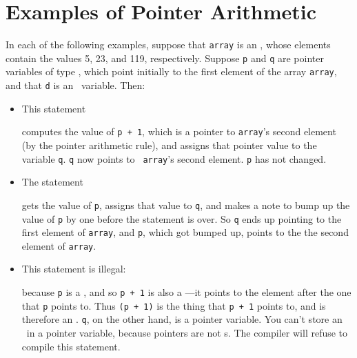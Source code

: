 %
%
%

\section{Examples of Pointer Arithmetic}

In each of the following examples, suppose that {\tt array} is an \Int, whose elements contain the values 5, 23, and 119, respectively.
Suppose {\tt p} and {\tt q} are pointer variables of type \Int, which
point initially to the first element of the array {\tt array}, and that
{\tt d} is an \int\ variable.  Then:

\begin{itemize}
\item This statement
\begin{flushleft}
\verb% q = p + 1; % 
\end{flushleft}

computes the value of {\tt p + 1}, which is a pointer to {\tt array}'s
second element (by the pointer arithmetic rule), and assigns that
pointer value to the variable {\tt q}.  {\tt q} now points to {\tt
array}'s second element.  {\tt p} has not changed.

\item The statement
\begin{flushleft}
\verb% q = p++; % 
\end{flushleft}

gets the value of {\tt p}, assigns that value to {\tt q}, and makes a
note to bump up the value of {\tt p} by one before the statement is
over.  So {\tt q} ends up pointing to the first element of {\tt array},
and {\tt p}, which got bumped up, points to the the second element of
{\tt array}.

\item This statement is illegal:

\begin{flushleft}
\verb% q = *(p + 1);%
\end{flushleft}

\noindent because {\tt p} is a \Int, and so {\tt p + 1} is also a
\Int---it points to the element after the one that {\tt p} points to.
Thus \mbox{\tt *(p + 1)} is the thing that \mbox{\tt p + 1} points to, and is
therefore an \int.  {\tt q}, on the other hand, is a pointer variable.
You can't store an \int\ in a pointer variable, because pointers are not
\int s. The compiler will refuse to compile this statement.


\end{itemize}
